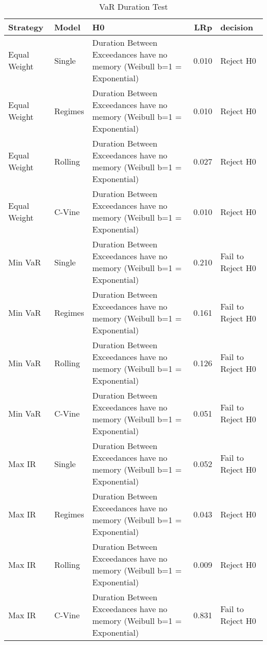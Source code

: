 \begin{table}

\caption{VaR Duration Test}
\centering
\begin{tabular}[t]{lllrl}
\toprule
Strategy & Model & H0 & LRp & decision\\
\midrule
Equal Weight & Single & Duration Between Exceedances have no memory (Weibull b=1 = Exponential) & 0.010 & Reject H0\\
Equal Weight & Regimes & Duration Between Exceedances have no memory (Weibull b=1 = Exponential) & 0.010 & Reject H0\\
Equal Weight & Rolling & Duration Between Exceedances have no memory (Weibull b=1 = Exponential) & 0.027 & Reject H0\\
Equal Weight & C-Vine & Duration Between Exceedances have no memory (Weibull b=1 = Exponential) & 0.010 & Reject H0\\
Min VaR & Single & Duration Between Exceedances have no memory (Weibull b=1 = Exponential) & 0.210 & Fail to Reject H0\\
\addlinespace
Min VaR & Regimes & Duration Between Exceedances have no memory (Weibull b=1 = Exponential) & 0.161 & Fail to Reject H0\\
Min VaR & Rolling & Duration Between Exceedances have no memory (Weibull b=1 = Exponential) & 0.126 & Fail to Reject H0\\
Min VaR & C-Vine & Duration Between Exceedances have no memory (Weibull b=1 = Exponential) & 0.051 & Fail to Reject H0\\
Max IR & Single & Duration Between Exceedances have no memory (Weibull b=1 = Exponential) & 0.052 & Fail to Reject H0\\
Max IR & Regimes & Duration Between Exceedances have no memory (Weibull b=1 = Exponential) & 0.043 & Reject H0\\
\addlinespace
Max IR & Rolling & Duration Between Exceedances have no memory (Weibull b=1 = Exponential) & 0.009 & Reject H0\\
Max IR & C-Vine & Duration Between Exceedances have no memory (Weibull b=1 = Exponential) & 0.831 & Fail to Reject H0\\
\bottomrule
\end{tabular}
\end{table}
